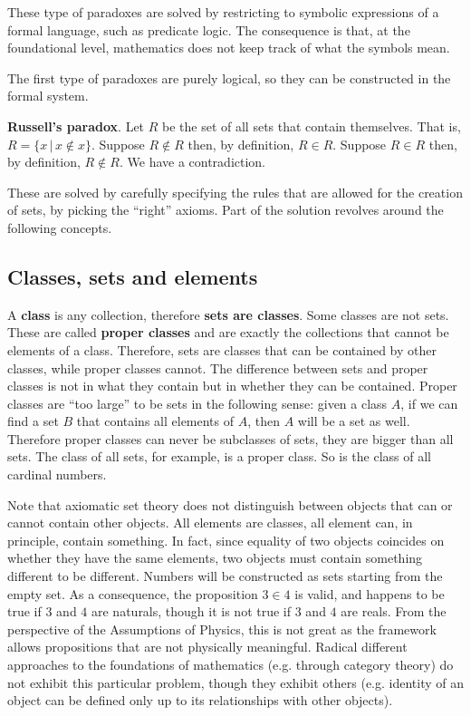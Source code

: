 \documentclass{article}
\newcommand{\marginright}[1] {\normalmarginpar\marginpar{#1}}
\begin{document}
These type of paradoxes are solved by restricting to symbolic expressions of a formal language, such as predicate logic. The consequence is that, at the foundational level, mathematics does not keep track of what the symbols mean.

The first type of paradoxes are purely logical, so they can be constructed in the formal system.

\textbf{Russell's paradox}. Let $R$ be the set of all sets that contain themselves. That is, $R=\{ x \, | \, x \notin x\}$. Suppose $R \notin R$ then, by definition, $R \in R$. Suppose $R \in R$ then, by definition, $R \notin R$. We have a contradiction.

These are solved by carefully specifying the rules that are allowed for the creation of sets, by picking the ``right'' axioms. Part of the solution revolves around the following concepts.



\subsection{Classes, sets and elements}

A \textbf{class} \marginright{TODO: diagram with Classes, proper classes and sets.}  is any collection, therefore \textbf{sets are classes}. Some classes are not sets. These are called \textbf{proper classes} and are exactly the collections that cannot be elements of a class. Therefore, sets are classes that can be contained by other classes, while proper classes cannot. The difference between sets and proper classes is not in what they contain but in whether they can be contained. Proper classes are ``too large'' to be sets in the following sense: given a class $A$, if we can find a set $B$ that contains all elements of $A$, then $A$ will be a set as well. Therefore proper classes can never be subclasses of sets, they are bigger than all sets. The class of all sets, for example, is a proper class. So is the class of all cardinal numbers.

Note that axiomatic set theory does not distinguish between objects that can or cannot contain other objects. All elements are classes, all element can, in principle, contain something. In fact, since equality of two objects coincides on whether they have the same elements, two objects must contain something different to be different. Numbers will be constructed as sets starting from the empty set. As a consequence, the proposition $3 \in 4$ is valid, and happens to be true if $3$ and $4$ are naturals, though it is not true if $3$ and $4$ are reals. From the perspective of the Assumptions of Physics, this is not great as the framework allows propositions that are not physically meaningful. Radical different approaches to the foundations of mathematics (e.g. through category theory) do not exhibit this particular problem, though they exhibit others (e.g. identity of an object can be defined only up to its relationships with other objects).
\end{document}
